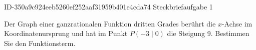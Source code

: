 \begin{exercise}
      {ID-350a9c924eeb5260ef252aaf31959b401e4cda74}
      {Steckbriefaufgabe 1}
  \ifproblem\problem\par
    Der Graph einer ganzrationalen Funktion dritten Grades berührt die
    $x$-Achse im Koordinatenursprung und hat im Punkt $P(-3\mid0)$ die
    Steigung \num{9}. Bestimmen Sie den Funktionsterm.
  \fi
\end{exercise}
